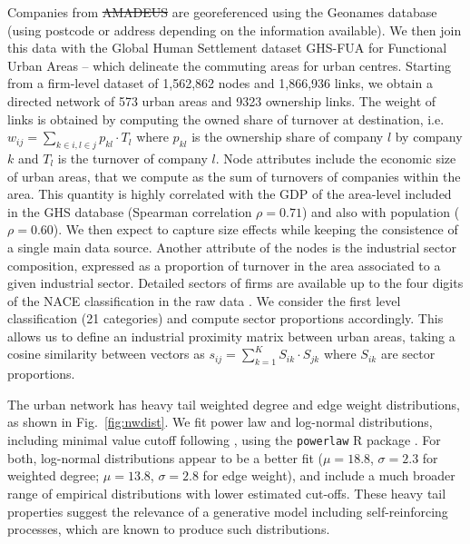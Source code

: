\documentclass[10pt,letterpaper]{article}
\providecommand{\DIFadd}[1]{{\protect\color{blue}\uwave{#1}}} %
\providecommand{\DIFdel}[1]{{\protect\color{red}\sout{#1}}}                      %
\providecommand{\DIFaddbegin}{} %
\providecommand{\DIFaddend}{} %
\providecommand{\DIFdelbegin}{} %
\providecommand{\DIFdelend}{} %
\begin{document}
\DIFaddend Companies from \DIFdelbegin %
\DIFdel{AMADEUS }%
\DIFdelend \DIFaddbegin \emph{\DIFadd{AMADEUS}} \DIFaddend are georeferenced using the Geonames database (using postcode or address depending on the information available). We then join this data with the Global Human Settlement dataset GHS-FUA for Functional Urban Areas \cite{Florczyk2019ghs} -- which delineate the commuting areas for urban centres. Starting from a firm-level dataset of 1,562,862 nodes and 1,866,936 links, we obtain a directed network of 573 urban areas and 9323 ownership links. The weight of links is obtained by computing the owned share of turnover at destination, i.e. $w_{ij} = \sum_{k \in i,l \in j} p_{kl} \cdot T_l$ where $p_{kl}$ is the ownership share of company $l$ by company $k$ and $T_l$ is the turnover of company $l$. Node attributes include the economic size of urban areas, that we compute as the sum of turnovers of companies within the area. This quantity is highly correlated with the GDP of the area-level included in the GHS database (Spearman correlation $\rho = 0.71$) and also with population ($\rho = 0.60$). We then expect to capture size effects while keeping the consistence of a single main data source. Another attribute of the nodes is the industrial sector composition, expressed as a proportion of turnover in the area associated to a given industrial sector. Detailed sectors of firms are available up to the four digits of the NACE classification in the raw data \cite{EUROSTAT2008}. We consider the first level classification (21 categories) and compute sector proportions accordingly. This allows us to define an industrial proximity matrix between urban areas, taking a cosine similarity between vectors as $s_{ij} = \sum_{k=1}^{K} S_{ik}\cdot S_{jk}$ where $S_{ik}$ are sector proportions.

\DIFaddbegin 

\DIFaddend The urban network \DIFaddbegin \DIFadd{is sparse with a density around $0.028$. It }\DIFaddend has heavy tail weighted degree and edge weight distributions, as shown in Fig.~\ref{fig:nwdist}. We fit power law and log-normal distributions, including minimal value cutoff following \cite{clauset2009power}, using the \texttt{powerlaw} R package \cite{powerlawpackage}. For both, log-normal distributions appear to be a better fit ($\mu=18.8$, $\sigma=2.3$ for weighted degree; $\mu=13.8$, $\sigma=2.8$ for edge weight), and include a much broader range of empirical distributions with lower estimated cut-offs. These heavy tail properties suggest the relevance of a generative model including self-reinforcing processes, which are known to produce such distributions.
\end{document}
